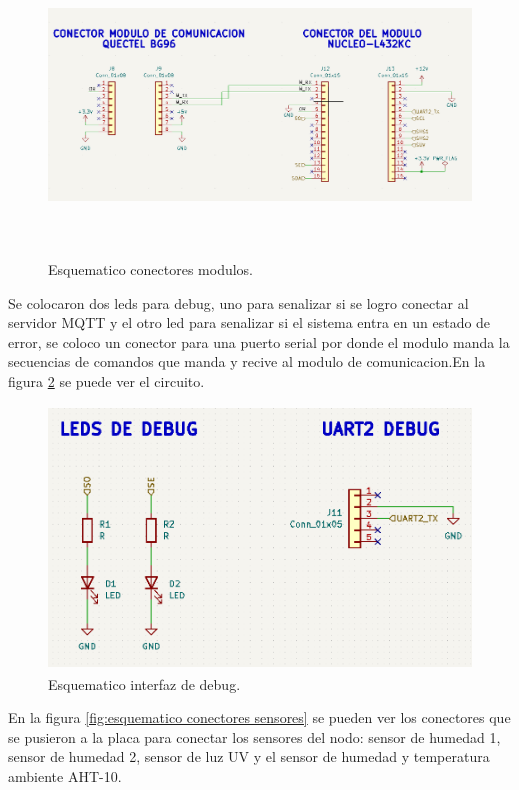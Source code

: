 \begin{figure}[h]
  \centering
	\includegraphics[width=\textwidth, height=8cm]{./Figures/esquematico_modulos.png}
	\caption{Esquematico conectores modulos.}
	\label{fig:esquematico modulos}
\end{figure}

Se colocaron dos leds para debug, uno para senalizar si se logro conectar al servidor MQTT y el otro led para senalizar si el sistema entra en un estado de error, se coloco un conector para una puerto serial por donde el modulo manda la secuencias de comandos que manda y recive al modulo de comunicacion.En la figura \ref{fig:esquematico conectores de debug} se puede ver el circuito.
\begin{figure}[h!]
  \centering
	\includegraphics[width=\textwidth, height=7cm]{./Figures/esquematico_debug.png}
	\caption{Esquematico interfaz de debug.}
	\label{fig:esquematico conectores de debug}
\end{figure}
\clearpage
En la figura \ref{fig:esquematico conectores sensores} se pueden ver los conectores que se pusieron a la placa para conectar los sensores del nodo: sensor de humedad 1, sensor de humedad 2, sensor de luz UV y el sensor de humedad y temperatura ambiente AHT-10.

